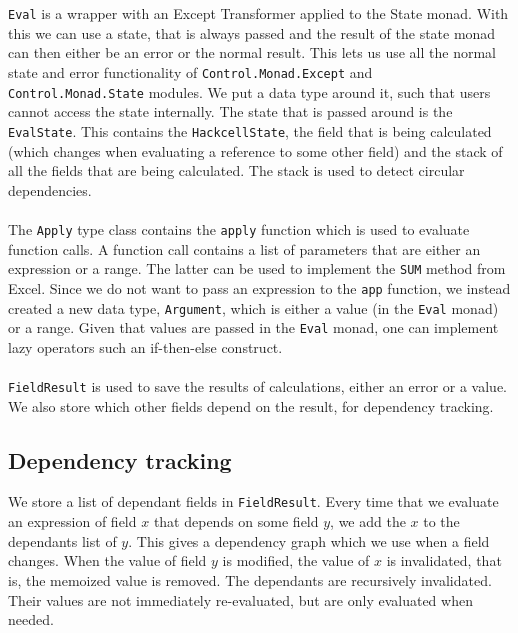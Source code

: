 \documentclass{article}
\begin{document}
\\\\	
	\texttt{Eval} is a wrapper with an Except Transformer applied to the State monad. With this we can use a state, that is always passed and the result of the state monad can then either be an error or the normal result. This lets us use all the normal state and error functionality of \texttt{Control.Monad.Except} and \texttt{Control.Monad.State} modules. We put a data type around it, such that users cannot access the state internally. The state that is passed around is the \texttt{EvalState}. This contains the \texttt{HackcellState}, the field that is being calculated (which changes when evaluating a reference to some other field) and the stack of all the fields that are being calculated. The stack is used to detect circular dependencies.
\\\\	
	The \texttt{Apply} type class contains the \texttt{apply} function which is used to evaluate function calls. A function call contains a list of parameters that are either an expression or a range. The latter can be used to implement the \texttt{SUM} method from Excel. Since we do not want to pass an expression to the \texttt{app} function, we instead created a new data type, \texttt{Argument}, which is either a value (in the \texttt{Eval} monad) or a range. Given that values are passed in the \texttt{Eval} monad, one can implement lazy operators such an if-then-else construct.
\\\\
	\texttt{FieldResult} is used to save the results of calculations, either an error or a value. We also store which other fields depend on the result, for dependency tracking.
	
	\subsection{Dependency tracking}
	We store a list of dependant fields in \texttt{FieldResult}. Every time that we evaluate an expression of field $x$ that depends on some field $y$, we add the $x$ to the dependants list of $y$. This gives a dependency graph which we use when a field changes. When the value of field $y$ is modified, the value of $x$ is invalidated, that is, the memoized value is removed. The dependants are recursively invalidated. Their values are not immediately re-evaluated, but are only evaluated when needed.
	
\end{document}
